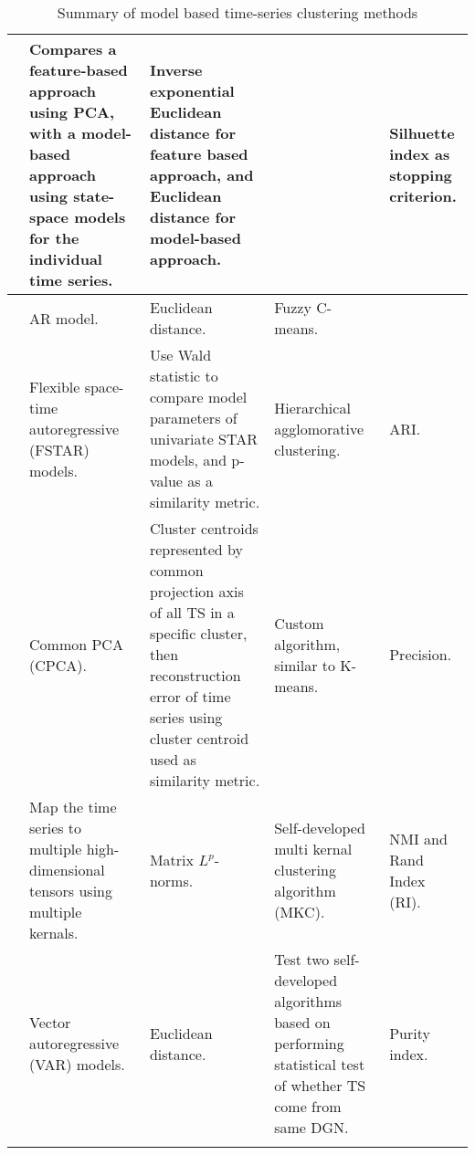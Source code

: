 \begin{longtable}{p{}p{}p{}p{}p{}}
    \cite{load_tsc_state_space_model}       & Compares a feature-based approach using PCA, with a model-based approach using state-space models for the individual time series.& Inverse exponential Euclidean distance for feature based approach, and Euclidean distance for model-based approach.& & Silhuette index as stopping criterion.\\ \hline
    \cite{struct_damage_ar_fuzzy_c_means}   & AR model.& Euclidean distance.& Fuzzy C-means.& \\ \hline
    \cite{fstar_hac_tsc}                    & Flexible space-time autoregressive (FSTAR) models.& Use Wald statistic to compare model parameters of univariate STAR models, and p-value as a similarity metric.& Hierarchical agglomorative clustering.& ARI.\\ \hline
    \cite{multivariate_tsc_common_pca}      & Common PCA (CPCA).& Cluster centroids represented by common projection axis of all TS in a specific cluster, then reconstruction error of time series using cluster centroid used as similarity metric.& Custom algorithm, similar to K-means.& Precision.\\ \hline
    \cite{tensor_multi_elastic_kernel_tsc}  & Map the time series to multiple high-dimensional tensors using multiple kernals.& Matrix $L^p$-norms.& Self-developed multi kernal clustering algorithm (MKC).& NMI and Rand Index (RI).\\ \hline
    \cite{var_multivar_tsc}                 & Vector autoregressive (VAR) models.& Euclidean distance.& Test two self-developed algorithms based on performing statistical test of whether TS come from same DGN. & Purity index.\\ \hline
    \hline
    \caption{Summary of model based time-series clustering methods}
    \label{tab:machine_learning_wt_cm_summary}
\end{longtable}

